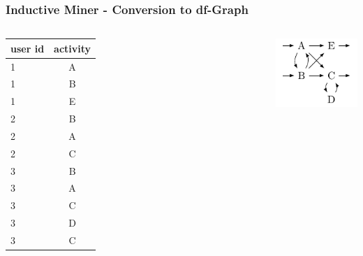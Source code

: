 \documentclass{beamer}
\begin{document}
\begin{frame}
\frametitle{Inductive Miner - Conversion to df-Graph}
\begin{columns}
\centering
\begin{tabular}{l|c}
 user id & activity\\
 \hline
 1 & A\\
  1 & B\\
 1 & E\\
 2 & B\\
  2 & A\\
 2 & C\\
 3 & B\\
  3 & A\\
 3 & C\\
 3 & D\\
 3 & C\\
 \end{tabular}
\centering
\includegraphics[width=0.4\linewidth]{img/dfgraphExample.pdf}
\end{columns}
\end{frame}
\end{document}
